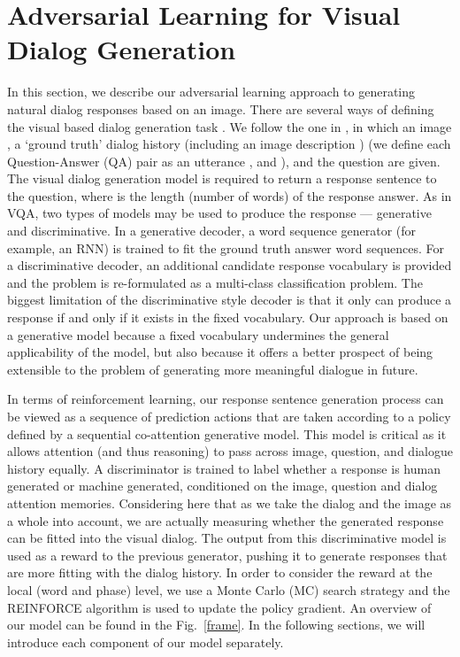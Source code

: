 \documentclass[10pt,twocolumn,letterpaper]{article}
\begin{document}
 \section{Adversarial Learning for Visual Dialog Generation}
\label{model}
In this section, we describe our adversarial learning approach to generating natural dialog responses based on an image. There are several ways of defining the visual based dialog generation task \cite{de2016guesswhat,mostafazadeh2017image}. We follow the one in \cite{das2016visual}, in which an image , a `ground truth' dialog history (including an image description )  (we define each Question-Answer (QA) pair as an utterance , and ), and the question  are given. The visual dialog generation model is required to return a response sentence  to the question, where  is the length (number of words) of the response answer. As in VQA, two types of models may be used to produce the response --- generative and discriminative. In a generative decoder, a word sequence generator (for example, an RNN) is trained to fit the ground truth answer word sequences. For a discriminative decoder, an additional candidate response vocabulary is provided and the problem is re-formulated as a multi-class classification problem. The biggest limitation of the discriminative style decoder is that it only can produce a response if and only if it exists in the fixed vocabulary. 
Our approach is based on a generative model because a fixed vocabulary undermines the general applicability of the model, but also because it offers a better prospect of being extensible to the problem of generating more meaningful dialogue in future. 

In terms of reinforcement learning, our response sentence generation process can be viewed as a sequence of prediction actions that are taken according to a policy defined by a sequential co-attention generative model.  This model is critical as it allows attention (and thus reasoning) to pass across image, question, and dialogue history equally.
A discriminator is trained to label whether a response is human generated or machine generated, conditioned on the image, question and dialog attention memories. Considering here that as we take the dialog and the image as a whole into account, we are actually measuring whether the generated response can be fitted into the visual dialog. The output from this discriminative model is used as a reward to the previous generator, pushing it to generate responses that are more fitting with the dialog history. In order to consider the reward at the local (\ie word and phase) level, we use a Monte Carlo (MC) search strategy and the REINFORCE algorithm \cite{williams1992simple} is used to update the policy gradient. An overview of our model can be found in the Fig.~\ref{frame}. In the following sections, we will introduce each component of our model separately.
\end{document}

